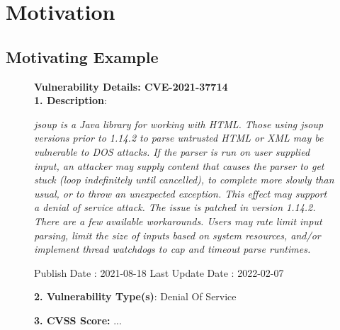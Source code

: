 \section{Motivation}
\label{motiv:sec}

\subsection{Motivating Example}
\label{exe:sec}





\begin{figure}[t]
  \begin{flushleft}
    \footnotesize
\textbf{Vulnerability Details: CVE-2021-37714}\\
\textbf{1. Description}:
{\em jsoup is a Java library for working with HTML. Those using jsoup versions prior to 1.14.2 to parse untrusted HTML or XML may be vulnerable to DOS attacks. If the parser is run on user supplied input, an attacker may supply content that causes the parser to get stuck (loop indefinitely until cancelled), to complete more slowly than usual, or to throw an unexpected exception. This effect may support a denial of service attack. The issue is patched in version 1.14.2. There are a few available workarounds. Users may rate limit input parsing, limit the size of inputs based on system resources, and/or implement thread watchdogs to cap and timeout parse runtimes.

  Publish Date : 2021-08-18 Last Update Date : 2022-02-07}

\textbf{2. Vulnerability Type(s)}: Denial Of Service

{\bf 3. CVSS Score:} ...\\


\end{flushleft}
\end{figure}
